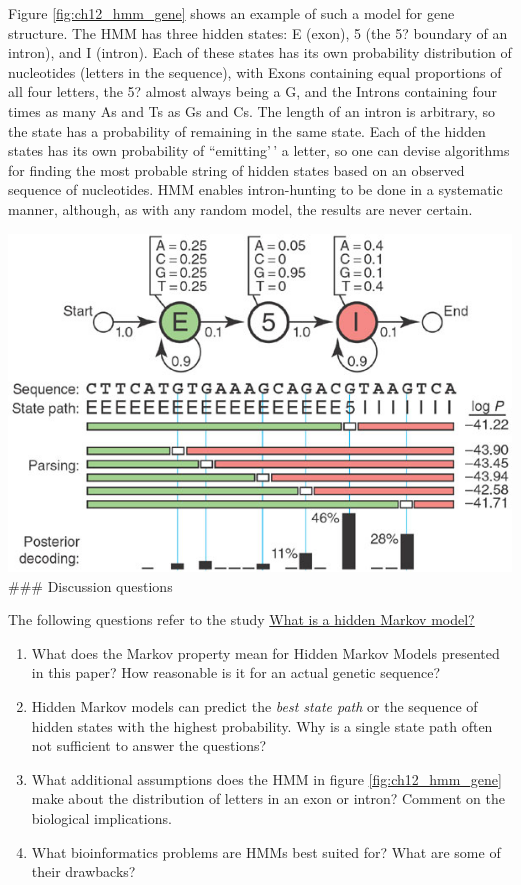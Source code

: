 \documentclass[
]{book}
\theoremstyle{definition}
\theoremstyle{definition}
\theoremstyle{definition}
\theoremstyle{remark}
\begin{document}
Figure \ref{fig:ch12_hmm_gene} shows an example of such a model for gene structure. The HMM has three hidden states: E (exon), 5 (the 5? boundary of an intron), and I (intron). Each of these states has its own probability distribution of nucleotides (letters in the sequence), with Exons containing equal proportions of all four letters, the 5? almost always being a G, and the Introns containing four times as many As and Ts as Gs and Cs. The length of an intron is arbitrary, so the state has a probability of remaining in the same state. Each of the hidden states has its own probability of ``emitting'\,' a letter, so one can devise algorithms for finding the most probable string of hidden states based on an observed sequence of nucleotides. HMM enables intron-hunting to be done in a systematic manner, although, as with any random model, the results are never certain.

\includegraphics{ch12/hmm_model.png}
\#\#\# Discussion questions

The following questions refer to the study \href{https://www.nature.com/articles/nbt1004-1315}{What is a hidden Markov model?}

\begin{enumerate}
\def\labelenumi{\arabic{enumi}.}
\item
  What does the Markov property mean for Hidden Markov Models presented in this paper? How reasonable is it for an actual genetic sequence?
\item
  Hidden Markov models can predict the \emph{best state path} or the sequence of hidden states with the highest probability. Why is a single state path often not sufficient to answer the questions?
\item
  What additional assumptions does the HMM in figure \ref{fig:ch12_hmm_gene} make about the distribution of letters in an exon or intron? Comment on the biological implications.
\item
  What bioinformatics problems are HMMs best suited for? What are some of their drawbacks?
\end{enumerate}
\end{document}
